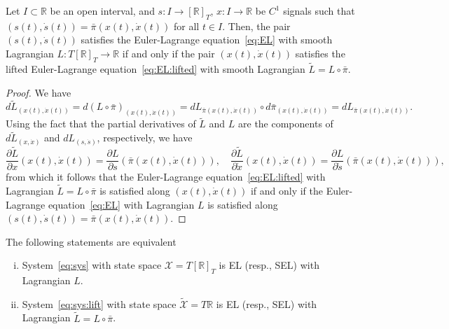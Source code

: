 \begin{lemma}
	\label{thm:lem2}
	Let $I \subset \mathbb{R}$ be an open interval, and $s:I \to [\mathbb{R}]_T$,
	$x:I \to \mathbb{R}$ be $C^1$ signals such that $(s(t),\dot s(t)) =
	\bar{\pi}(x(t),\dot x(t))$ for all $t \in I$. Then, the pair $(s(t),\dot
	s(t))$ satisfies the Euler-Lagrange equation~\eqref{eq:EL} with smooth
	Lagrangian $L: T [\mathbb{R}]_T \to \mathbb{R}$ if and only if the pair $(x(t),\dot
	x(t))$ satisfies the lifted Euler-Lagrange
	equation~\eqref{eq:EL:lifted} with smooth Lagrangian $\tilde L = L
	\circ \bar{\pi}$.
\end{lemma}
\begin{proof}
	We have
				\[
	d\tilde{L}_{(x(t),\dot{x}(t))}=d(L\circ\bar{\pi})_{(x(t),\dot{x}(t))}=dL_{\bar{\pi}(x(t),\dot{x}(t))}\circ
	d\bar{\pi}_{(x(t),\dot{x}(t))}=dL_{\bar{\pi}(x(t),\dot x(t))}.
	\]
				Using the fact that the partial derivatives of $\tilde L$ and $L$ are
	the components of $d\tilde L_{(x,\dot x)}$ and $d L_{(s,\dot s)}$,
	respectively, we have
				\[
	\frac{\partial\tilde{L}}{\partial x}(x(t),\dot{x}(t)) = \frac{\partial
		L}{\partial s}(\bar{\pi}(x(t),\dot{x}(t))), \quad
		\frac{\partial\tilde{L}}{\partial
		\dot{x}}(x(t),\dot{x}(t))=
	\frac{\partial L}{\partial \dot{s}}
	(\bar{\pi}(x(t),\dot{x}(t))),
	\]
				from which it follows that the Euler-Lagrange
	equation~\eqref{eq:EL:lifted} with Lagrangian $\tilde L = L \circ
	\bar{\pi}$ is satisfied along $(x(t),\dot{x}(t))$ if and only if the
	Euler-Lagrange equation~\eqref{eq:EL} with Lagrangian $L$ is
	satisfied along $(s(t),\dot{s}(t))=\bar{\pi}(x(t),\dot{x}(t))$.
	\qquad\end{proof}
\begin{proposition}
	\label{prop:equivR_RmodT}
	The following statements are equivalent
				\begin{enumerate}[(i)]
		
		\item System~\eqref{eq:sys} with state space $\mathcal{X} = T [\mathbb{R}]_T$ is EL
		(resp., SEL) with Lagrangian $L$.
		
		\item System~\eqref{eq:sys:lift} with state space $\tilde{\mathcal{X}} =T \mathbb{R}$
		is EL (resp., SEL) with Lagrangian $\tilde{L}=L\circ \bar{\pi}$.
		
	\end{enumerate}
			\end{proposition}
